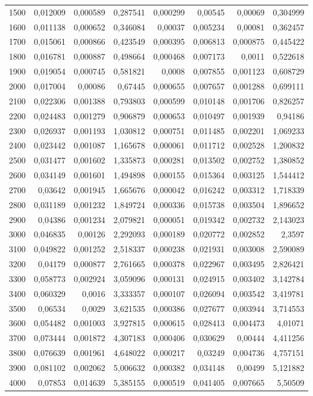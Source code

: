 \begin{tabular}{r r r r r r r r}
1500 & 0,012009 & 0,000589 & 0,287541 & 0,000299 & 0,00545 & 0,00069 & 0,304999 \\
1600 & 0,011138 & 0,000652 & 0,346084 & 0,00037 & 0,005234 & 0,00081 & 0,362457 \\
1700 & 0,015061 & 0,000866 & 0,423549 & 0,000395 & 0,006813 & 0,000875 & 0,445422 \\
1800 & 0,016781 & 0,000887 & 0,498664 & 0,000468 & 0,007173 & 0,0011 & 0,522618 \\
1900 & 0,019054 & 0,000745 & 0,581821 & 0,0008 & 0,007855 & 0,001123 & 0,608729 \\
2000 & 0,017004 & 0,00086 & 0,67445 & 0,000655 & 0,007657 & 0,001288 & 0,699111 \\
2100 & 0,022306 & 0,001388 & 0,793803 & 0,000599 & 0,010148 & 0,001706 & 0,826257 \\
2200 & 0,024483 & 0,001279 & 0,906879 & 0,000653 & 0,010497 & 0,001939 & 0,94186 \\
2300 & 0,026937 & 0,001193 & 1,030812 & 0,000751 & 0,011485 & 0,002201 & 1,069233 \\
2400 & 0,023442 & 0,001087 & 1,165678 & 0,000061 & 0,011712 & 0,002528 & 1,200832 \\
2500 & 0,031477 & 0,001602 & 1,335873 & 0,000281 & 0,013502 & 0,002752 & 1,380852 \\
2600 & 0,034149 & 0,001601 & 1,494898 & 0,000155 & 0,015364 & 0,003125 & 1,544412 \\
2700 & 0,03642 & 0,001945 & 1,665676 & 0,000042 & 0,016242 & 0,003312 & 1,718339 \\
2800 & 0,031189 & 0,001232 & 1,849724 & 0,000336 & 0,015738 & 0,003504 & 1,896652 \\
2900 & 0,04386 & 0,001234 & 2,079821 & 0,000051 & 0,019342 & 0,002732 & 2,143023 \\
3000 & 0,046835 & 0,00126 & 2,292093 & 0,000189 & 0,020772 & 0,002852 & 2,3597 \\
3100 & 0,049822 & 0,001252 & 2,518337 & 0,000238 & 0,021931 & 0,003008 & 2,590089 \\
3200 & 0,04179 & 0,000877 & 2,761665 & 0,000378 & 0,022967 & 0,003495 & 2,826421 \\
3300 & 0,058773 & 0,002924 & 3,059096 & 0,000131 & 0,024915 & 0,003402 & 3,142784 \\
3400 & 0,060329 & 0,0016 & 3,333357 & 0,000107 & 0,026094 & 0,003542 & 3,419781 \\
3500 & 0,06534 & 0,0029 & 3,621535 & 0,000386 & 0,027677 & 0,003944 & 3,714553 \\
3600 & 0,054482 & 0,001003 & 3,927815 & 0,000615 & 0,028413 & 0,004473 & 4,01071 \\
3700 & 0,073444 & 0,001872 & 4,307183 & 0,000406 & 0,030629 & 0,00444 & 4,411256 \\
3800 & 0,076639 & 0,001961 & 4,648022 & 0,000217 & 0,03249 & 0,004736 & 4,757151 \\
3900 & 0,081102 & 0,002062 & 5,006632 & 0,000382 & 0,034148 & 0,00499 & 5,121882 \\
4000 & 0,07853 & 0,014639 & 5,385155 & 0,000519 & 0,041405 & 0,007665 & 5,50509 \\
\end{tabular}


